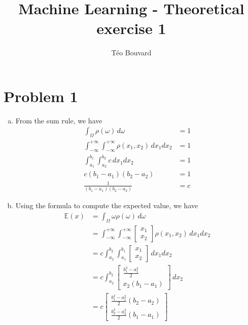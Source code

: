 \documentclass[a4paper, 12pt, twoside]{article}
\begin{document}
\title{Machine Learning - Theoretical exercise 1}
\author{T\'eo Bouvard}
\maketitle

\section{Problem 1}
\begin{enumerate}[a)]
    \item From the sum rule, we have
    \begin{align*}
        \int_\Omega \rho(\omega) \,d\omega &= 1 \\
        \int_{-\infty}^{+\infty}\int_{-\infty}^{+\infty} \rho(x_1, x_2) \,dx_1dx_2 &= 1 \\
        \int_{a_1}^{b_1}\int_{a_2}^{b_2} c \,dx_1dx_2 &= 1 \\
        c(b_1-a_1)(b_2-a_2) &= 1 \\
        \frac{1}{(b_1-a_1)(b_2-a_2)} &= c
    \end{align*}

    \item Using the formula to compute the expected value, we have
    \begin{align*}
        \mathbb{E}(x) &= \int_\Omega \omega\rho(\omega) \,d\omega \\
        &= \int_{-\infty}^{+\infty}\int_{-\infty}^{+\infty} \begin{bmatrix} x_1 \\ x_2 \end{bmatrix}\rho(x_1, x_2) \,dx_1dx_2 \\
        &= c \int_{a_2}^{b_2}\int_{a_1}^{b_1} \begin{bmatrix} x_1 \\ x_2 \end{bmatrix} \,dx_1dx_2 \\
        &= c \int_{a_2}^{b_2} \begin{bmatrix} \frac{b_1^2 - a_1^2}{2} \\ x_2(b_1-a_1) \end{bmatrix} \,dx_2 \\
        &= c\begin{bmatrix} \frac{b_1^2 - a_1^2}{2}(b_2-a_2) \\ \frac
        {b_2^2 - a_2^2}{2}(b_1-a_1) \end{bmatrix}
    \end{align*}


\end{enumerate}
\end{document}
